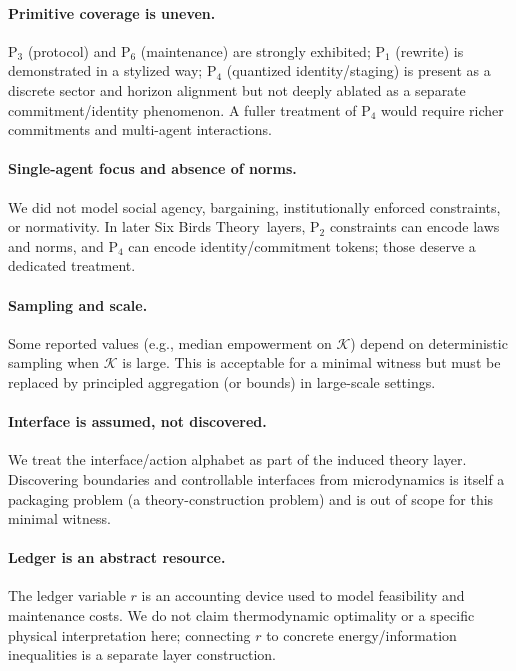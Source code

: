 \documentclass[11pt]{article}
\newcommand{\SBT}{Six Birds Theory}
\newcommand{\K}{\mathcal{K}}
\begin{document}
\paragraph{Primitive coverage is uneven.}
P$_3$ (protocol) and P$_6$ (maintenance) are strongly exhibited; P$_1$ (rewrite) is demonstrated in a stylized way; P$_4$ (quantized identity/staging) is present as a discrete sector and horizon alignment but not deeply ablated as a separate commitment/identity phenomenon. A fuller treatment of P$_4$ would require richer commitments and multi-agent interactions.

\paragraph{Single-agent focus and absence of norms.}
We did not model social agency, bargaining, institutionally enforced constraints, or normativity. In later \SBT\ layers, P$_2$ constraints can encode laws and norms, and P$_4$ can encode identity/commitment tokens; those deserve a dedicated treatment.

\paragraph{Sampling and scale.}
Some reported values (e.g., median empowerment on $\K$) depend on deterministic sampling when $\K$ is large. This is acceptable for a minimal witness but must be replaced by principled aggregation (or bounds) in large-scale settings.

\paragraph{Interface is assumed, not discovered.}
We treat the interface/action alphabet as part of the induced theory layer. Discovering boundaries and controllable interfaces from microdynamics is itself a packaging problem (a theory-construction problem) and is out of scope for this minimal witness.

\paragraph{Ledger is an abstract resource.}
The ledger variable $r$ is an accounting device used to model feasibility and maintenance costs. We do not claim thermodynamic optimality or a specific physical interpretation here; connecting $r$ to concrete energy/information inequalities is a separate layer construction.
\end{document}
